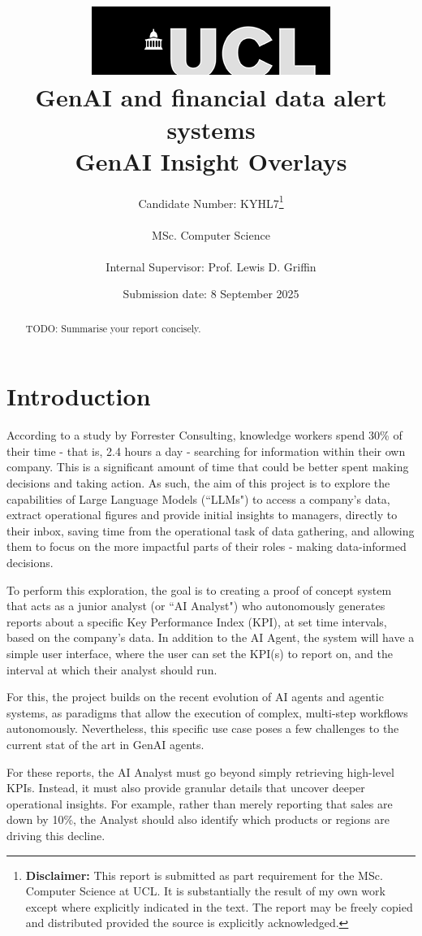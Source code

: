 \documentclass[a4paper]{report}
\title{{\vspace{-14em} \includegraphics[scale=0.4]{images/ucl_logo.png}}\\
{{\Huge GenAI and financial data alert systems}}\\
{\large GenAI Insight Overlays}\\
}
\date{Submission date: 8 September 2025}
\author{Candidate Number: KYHL7\thanks{
{\bf Disclaimer:}
This report is submitted as part requirement for the MSc. Computer Science at UCL. It is substantially the result of my own work except where explicitly indicated in the text. The report may be freely copied and distributed provided the source is explicitly acknowledged.}
\\ \\
MSc. Computer Science\\ \\
Internal Supervisor: Prof. Lewis D. Griffin}
\begin{document}
 
\onehalfspacing

\maketitle
\begin{abstract}
TODO: Summarise your report concisely.
\end{abstract}

\tableofcontents

\setcounter{page}{1}


\chapter{Introduction}
\label{chapter:introduction}

According to a study by Forrester Consulting, knowledge workers spend 30\% of their time - that is, 2.4 hours a day - searching for information within their own company\cite{forrester2022}. This is a significant amount of time that could be better spent making decisions and taking action. As such, the aim of this project is to explore the capabilities of Large Language Models (``LLMs") to access a company's data, extract operational figures and provide initial insights to managers, directly to their inbox, saving time from the operational task of data gathering, and allowing them to focus on the more impactful parts of their roles - making data-informed decisions.

To perform this exploration, the goal is to creating a proof of concept system that acts as a junior analyst (or ``AI Analyst") who autonomously generates reports about a specific Key Performance Index (KPI), at set time intervals, based on the company's data. In addition to the AI Agent, the system will have a simple user interface, where the user can set the KPI(s) to report on, and the interval at which their analyst should run.

For this, the project builds on the recent evolution of AI agents and agentic systems, as paradigms that allow the execution of complex, multi-step workflows autonomously. Nevertheless, this specific use case poses a few challenges to the current stat of the art in GenAI agents.

For these reports, the AI Analyst must go beyond simply retrieving high-level KPIs. Instead, it must also provide granular details that uncover deeper operational insights. For example, rather than merely reporting that sales are down by 10\%, the Analyst should also identify which products or regions are driving this decline.
\end{document}
